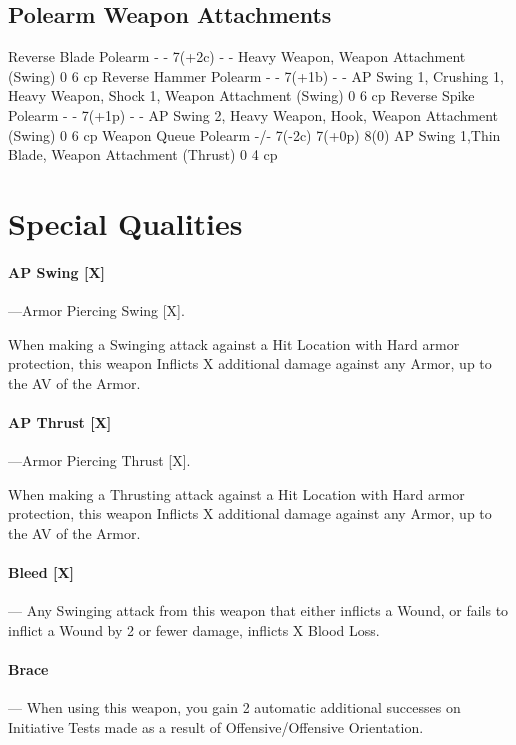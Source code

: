 \documentclass[oneside,11pt,english]{book}
\begin{document}
\subsection{Polearm Weapon Attachments} %
Reverse Blade Polearm - - 7(+2c) - - Heavy Weapon, Weapon Attachment (Swing) 0 6 cp
Reverse Hammer Polearm - - 7(+1b) - - AP Swing 1, Crushing 1, Heavy Weapon, Shock 1, Weapon Attachment (Swing) 0 6 cp
Reverse Spike Polearm - - 7(+1p) - - AP Swing 2, Heavy Weapon, Hook, Weapon Attachment (Swing) 0 6 cp
Weapon Queue Polearm -/- 7(-2c) 7(+0p) 8(0) AP Swing 1,Thin Blade, Weapon Attachment (Thrust) 0 4 cp

\section{Special Qualities}\label{sec:weapons-special-qualities}
\paragraph{\label{wepqual:AP Swing}AP Swing [X]}---\quad Armor Piercing Swing [X].

When making a Swinging attack against a Hit Location with Hard armor protection, this weapon Inflicts X additional damage against any Armor, up to the AV of the Armor.

\paragraph{\label{wepqual:AP Thrust}AP Thrust [X]}---\quad Armor Piercing Thrust [X].

When making a Thrusting attack against a Hit Location with Hard armor protection, this weapon Inflicts X additional damage against any Armor, up to the AV of the Armor.

\paragraph{\label{wepqual:Bleed}Bleed [X]}---\quad
Any Swinging attack from this weapon that either inflicts a Wound, or fails to inflict a Wound by 2 or fewer damage, inflicts X Blood Loss. 
\paragraph{\label{wepqual:Brace}Brace}---\quad
When using this weapon, you gain 2 automatic additional successes on Initiative Tests made as a result of Offensive/Offensive Orientation.
\end{document}

